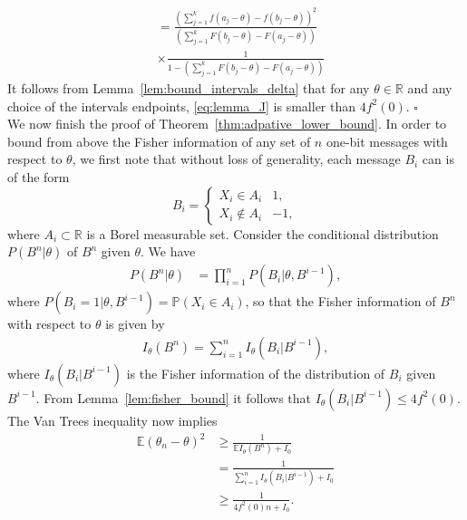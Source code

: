 \documentclass[letterpaper, 11pt]{IEEEtran}      %
\newcommand*{\QEDA}{\hfill\ensuremath{\square}}
\begin{document}
\begin{align}
& =   \frac { \left( \sum_{j=1}^{k} f \left(a_j-\theta \right) - f \left( b_j-\theta \right)  \right)^2 } 
{ \left( \sum_{j=1}^k F \left( b_j-\theta \right) - F \left( a_j-\theta \right)  \right) }  \nonumber \\
& \times \frac {1} 
{1- \left( \sum_{j=1}^k F \left(  b_j-\theta \right) - F \left( a_j-\theta \right)  \right) } 
\label{eq:lemma_J}
\end{align}
It follows from Lemma~\ref{lem:bound_intervals_delta} that for any $\theta \in \mathbb R$ and any choice of the intervals endpoints, \eqref{eq:lemma_J} is smaller than $4f^2(0)$.  \QEDA \\

We now finish the proof of Theorem~\ref{thm:adpative_lower_bound}. In order to bound from above the Fisher information of any set of $n$ one-bit messages with respect to $\theta$, we first note that without loss of generality, each message $B_i$ can is of the form
\begin{equation}
\label{eq:general_messages}
B_i = \begin{cases}
X_i \in A_i & 1, \\
X_i \notin A_i & -1,
\end{cases} 
\end{equation}
where $A_i \subset \mathbb R$ is a Borel measurable set. 
Consider the conditional distribution $P({B^n|\theta})$ of $B^n$ given $\theta$. We have 
\begin{align}
P\left( B^n | \theta \right) & =  \prod_{i=1}^n P\left(B_i | \theta, B^{i-1} \right), \label{eq:adpt_lower_bound_proof:1}
\end{align}
where $P\left(B_i =1 | \theta, B^{i-1}  \right) = \mathbb P\left( X_i \in A_i\right)$, so that the Fisher information of $B^n$ with respect to $\theta$ is given by 
\begin{align}
I_\theta(B^n) = \sum_{i=1}^n I_\theta (B_i|B^{i-1}),
\label{eq:fisher_information}
\end{align}
where $I_\theta (B_i|B^{i-1})$ is the Fisher information of the distribution of $B_i$ given $B^{i-1}$. From Lemma~\ref{lem:fisher_bound} it follows that $I_\theta (B_i|B^{i-1}) \leq 4f^2(0)$. The Van Trees inequality \cite{van2004detection, gill1995applications} now implies 
\begin{align*}
\mathbb E \left( \theta_n - \theta \right)^2 &  \geq \frac{1}{ \mathbb E I_\theta(B^n) + I_0} \\
& = \frac{1}{ \sum_{i=1}^n I_\theta (B_i | B^{i-1} ) + I_0} \\
& \geq \frac{1}{ 4f^2(0) n + I_0}.
\end{align*}
\end{document}
